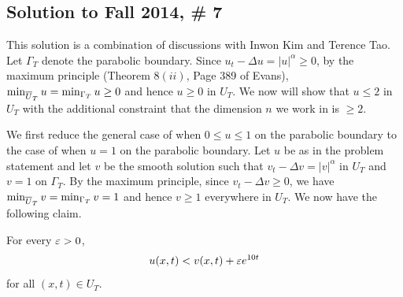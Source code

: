 \subsection*{Solution to Fall 2014, \# 7}
\label{F14Q7}

This solution is a combination of discussions with Inwon Kim and Terence Tao.
Let $\Gamma_{T}$ denote the parabolic boundary.
Since $u_{t} - \Delta u = |u|^{\alpha} \geq 0$, by the maximum principle (Theorem $8(ii)$, Page 389 of Evans), $\min_{\overline{U}_{T}}u = \min_{\Gamma_{T}}u \geq 0$ and hence
$u \geq 0$ in $U_{T}$. We now will show that $u \leq 2$ in $U_{T}$ with the additional constraint that the dimension $n$ we work in is $\geq 2$.

We first reduce the general case of when $0 \leq u \leq 1$ on the parabolic boundary to the case of when $u = 1$ on the parabolic boundary.
Let $u$ be as in the problem statement and let
$v$ be the smooth solution such that $v_{t} - \Delta v = |v|^{\alpha}$ in $U_{T}$ and $v = 1$ on $\Gamma_{T}$.
By the maximum principle, since $v_{t} - \Delta v \geq 0$, we have
$\min_{\overline{U}_{T}}v = \min_{\Gamma_{T}}v = 1$ and hence $v \geq 1$ everywhere in $U_{T}$.
We now have the following claim.
\begin{claim}\label{F14Q7lem1}
For every $\varepsilon > 0$,
\begin{align}\label{F14Q7eqlem}
u(x, t) < v(x, t) + \varepsilon e^{10t}
\end{align}
for all $(x, t) \in U_{T}$.
\end{claim}
